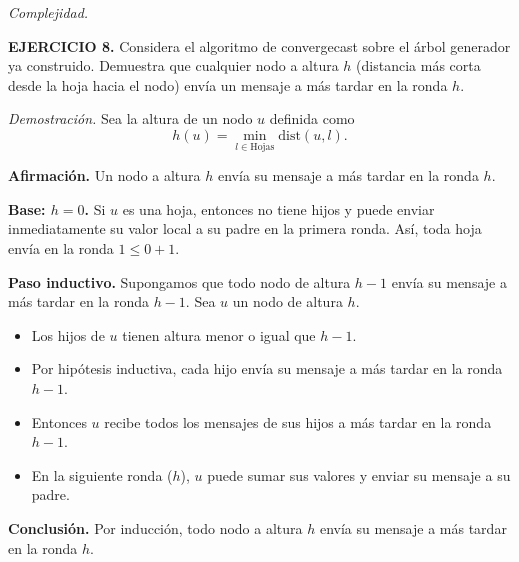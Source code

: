 \documentclass[12pt]{article}
\begin{document}
\medskip

\textit{Complejidad.} 
\begin{itemize}
  \item \textbf{Mensajes:} se envía exactamente un mensaje por arista, 
  por lo que el costo total es $O(|\Pi|)$. 
  \item \textbf{Tiempo:} $O(\{altura del árbol})$ rondas síncronas.
\end{itemize}



\begin{ejercicio}
\noindent \textbf{EJERCICIO 8.} 
Considera el algoritmo de convergecast sobre el árbol generador ya construido.
Demuestra que cualquier nodo a altura $h$ (distancia más corta desde la hoja hacia el nodo)
envía un mensaje a más tardar en la ronda $h$. \\
\end{ejercicio}

\textit{Demostración.} Sea la altura de un nodo $u$ definida como
\[
h(u) = \min_{l \in \text{Hojas}} \mathrm{dist}(u,l).
\]

\textbf{Afirmación.} Un nodo a altura $h$ envía su mensaje a más tardar en la ronda $h$.

\medskip

\textbf{Base: $h=0$.}  
Si $u$ es una hoja, entonces no tiene hijos y puede enviar inmediatamente 
su valor local a su padre en la primera ronda. 
Así, toda hoja envía en la ronda $1 \leq 0+1$.

\medskip

\textbf{Paso inductivo.}  
Supongamos que todo nodo de altura $h-1$ envía su mensaje a más tardar en 
la ronda $h-1$. Sea $u$ un nodo de altura $h$.  
\begin{itemize}
  \item Los hijos de $u$ tienen altura menor o igual que $h-1$.  
  \item Por hipótesis inductiva, cada hijo envía su mensaje a más tardar en la ronda $h-1$.  
  \item Entonces $u$ recibe todos los mensajes de sus hijos a más tardar en la ronda $h-1$.  
  \item En la siguiente ronda ($h$), $u$ puede sumar sus valores y enviar su mensaje a su padre.  
\end{itemize}

\medskip

\textbf{Conclusión.}  
Por inducción, todo nodo a altura $h$ envía su mensaje a más tardar en la ronda $h$.  
\end{document}
